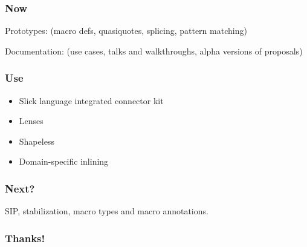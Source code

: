 \documentclass[hyperref={bookmarks=false}]{beamer}
\begin{document}
\begin{frame}[fragile]
\frametitle{Now}

Prototypes: 
(macro defs, quasiquotes, splicing, pattern matching)

Documentation: 
(use cases, talks and walkthroughs, alpha versions of proposals)
\end{frame}

\begin{frame}[fragile]
\frametitle{Use}

\begin{itemize}
\item Slick language integrated connector kit
\item Lenses
\item Shapeless
\item Domain-specific inlining
\end{itemize}
\end{frame}

\begin{frame}[fragile]
\frametitle{Next?}

SIP, stabilization, macro types and macro annotations.
\end{frame}

\begin{frame}[fragile]
\frametitle{Thanks!}

\centering
{}

\end{frame}
\end{document}
